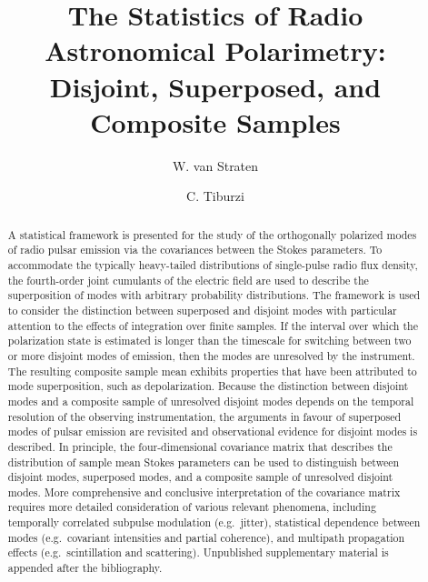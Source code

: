 \documentclass[twocolumn]{aastex6}
\begin{document}
\title{ The Statistics of Radio Astronomical Polarimetry: \\
	Disjoint, Superposed, and Composite Samples }

\author{W. van Straten}

\author{C. Tiburzi}

\begin{abstract}

A statistical framework is presented for the study of the orthogonally
polarized modes of radio pulsar emission via the covariances between
the Stokes parameters.  To accommodate the typically heavy-tailed
distributions of single-pulse radio flux density, the fourth-order
joint cumulants of the electric field are used to describe the
superposition of modes with arbitrary probability distributions.  The
framework is used to consider the distinction between superposed and
disjoint modes with particular attention to the effects of integration
over finite samples.  If the interval over which the polarization
state is estimated is longer than the timescale for switching between
two or more disjoint modes of emission, then the modes are unresolved
by the instrument.  The resulting composite sample mean exhibits
properties that have been attributed to mode superposition, such as
depolarization.  Because the distinction between disjoint modes and a
composite sample of unresolved disjoint modes depends on the temporal
resolution of the observing instrumentation, the arguments in favour
of superposed modes of pulsar emission are revisited and observational
evidence for disjoint modes is described.  In principle, the
four-dimensional covariance matrix that describes the distribution of
sample mean Stokes parameters can be used to distinguish between
disjoint modes, superposed modes, and a composite sample of unresolved
disjoint modes.  More comprehensive and conclusive interpretation of
the covariance matrix requires more detailed consideration of various
relevant phenomena, including temporally correlated subpulse
modulation (e.g.\ jitter), statistical dependence between modes
(e.g.\ covariant intensities and partial coherence), and multipath
propagation effects (e.g.\ scintillation and scattering).
%
Unpublished supplementary material is appended after the bibliography.

\end{abstract}
\end{document}
